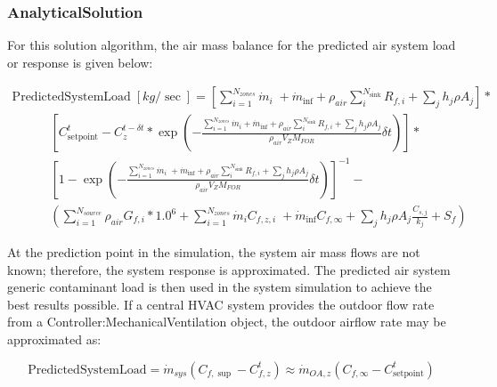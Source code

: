 \subsubsection{AnalyticalSolution}\label{analyticalsolution-000}

For this solution algorithm, the air mass balance for the predicted air system load or response is given below:

\begin{equation}
\begin{array}{l}{\mathrm{PredictedSystemLoad}}\;[kg/\sec ] = \left[ {\sum\limits_{i = 1}^{{N_{zones}}} {{{\dot m}_i}} \; + {{\dot m}_{\inf }} + {\rho_{air}}\sum\limits_i^{{N_{{\mathrm{sink}}}}} {{R_{f,i}} + \sum\limits_j {{h_j}\rho {A_j}} } } \right]*\\\;\;\;\;\;\;\;\;\;\;\;\left[ {C_{{\mathrm{setpoint}}}^t - C_z^{t - \delta t}*\exp \left( { - \frac{{\sum\limits_{i = 1}^{{N_{zones}}} {{{\dot m}_i}}  + {{\dot m}_{\inf }} + {\rho_{air}}\sum\limits_i^{{N_{{\mathrm{sink}}}}} {{R_{f,i}} + \sum\limits_j {{h_j}\rho {A_j}} } }}{{{\rho_{air}}{V_Z}{M_{FOR}}}}\delta t} \right)} \right]*\\\;\;\;\;\;\;\;\;\;\;\;{\left[ {1 - \exp \left( { - \frac{{\sum\limits_{i = 1}^{{N_{zones}}} {{{\dot m}_i}} \; + {{\dot m}_{\inf }} + {\rho_{air}}\sum\limits_i^{{N_{{\mathrm{sink}}}}} {{R_{f,i}} + \sum\limits_j {{h_j}\rho {A_j}} } }}{{{\rho_{air}}{V_Z}{M_{FOR}}}}\delta t} \right)} \right]^{ - 1}} - \\\;\;\;\;\;\;\;\;\;\;\;\left( {\sum\limits_{i = 1}^{{N_{source}}} {{\rho_{air}}{G_{f,i}}*{{1.0}^6}}  + \sum\limits_{i = 1}^{{N_{zones}}} {{{\dot m}_i}} {C_{f,z,i}}\; + {{\dot m}_{\inf }}{C_{f,\infty }} + \sum\limits_j {{h_j}\rho {A_j}} \frac{{{C_{s,j}}}}{{{k_j}}} + {S_f}} \right)\end{array}
\end{equation}

At the prediction point in the simulation, the system air mass flows are not known; therefore, the system response is approximated. The predicted air system generic contaminant load is then used in the system simulation to achieve the best results possible. If a central HVAC system provides the outdoor flow rate from a Controller:MechanicalVentilation object, the outdoor airflow rate may be approximated as:

\begin{equation}
{\mathrm{PredictedSystemLoad}} = {\dot m_{sys}}\left( {{C_{f,\sup }} - C_{f,z}^t} \right) \approx {\dot m_{OA,z}}\left( {{C_{f,\infty }} - C_{{\mathrm{setpoint}}}^t} \right)
\end{equation}

